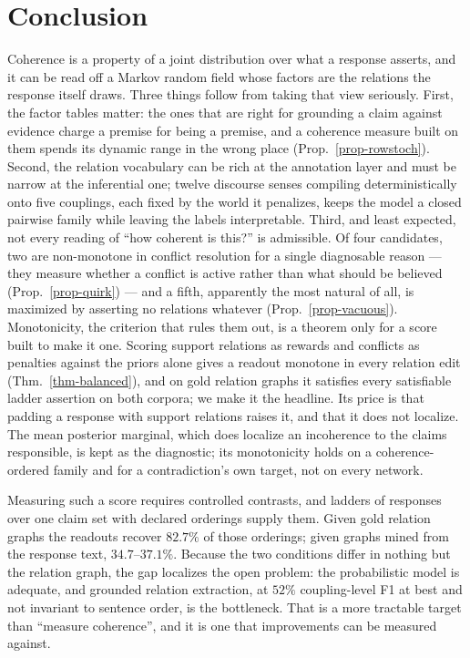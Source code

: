 \section{Conclusion}

Coherence is a property of a joint distribution over what a response asserts, and it can be read off a
Markov random field whose factors are the relations the response itself draws. Three things follow from
taking that view seriously. First, the factor tables matter: the ones that are right for grounding a
claim against evidence charge a premise for being a premise, and a coherence measure built on them
spends its dynamic range in the wrong place (Prop.~\ref{prop-rowstoch}). Second, the relation
vocabulary can be rich at the annotation layer and must be narrow at the inferential one; twelve
discourse senses compiling deterministically onto five couplings, each fixed by the world it penalizes,
keeps the model a closed pairwise family while leaving the labels interpretable. Third, and least
expected, not every reading of ``how coherent is this?'' is admissible. Of four candidates, two are
non-monotone in conflict resolution for a single diagnosable reason --- they measure whether a conflict
is active rather than what should be believed (Prop.~\ref{prop-quirk}) --- and a fifth, apparently the
most natural of all, is maximized by asserting no relations whatever (Prop.~\ref{prop-vacuous}).
Monotonicity, the criterion that rules them out, is a theorem only for a score built to make it one.
Scoring support relations as rewards and conflicts as penalties against the priors alone gives a
readout monotone in every relation edit (Thm.~\ref{thm-balanced}), and on gold relation graphs it
satisfies every satisfiable ladder assertion on both corpora; we make it the headline. Its price is
that padding a response with support relations raises it, and that it does not localize. The mean
posterior marginal, which does localize an incoherence to the claims responsible, is kept as the
diagnostic; its monotonicity holds on a coherence-ordered family and for a contradiction's own
target, not on every network.

Measuring such a score requires controlled contrasts, and ladders of responses over one claim set with
declared orderings supply them. Given gold relation graphs the readouts recover $82.7\%$ of those
orderings; given graphs mined from the response text, $34.7$--$37.1\%$. Because the two conditions
differ in nothing but the relation graph, the gap localizes the open problem: the probabilistic model is
adequate, and grounded relation extraction, at $52\%$ coupling-level F1 at best and not invariant to
sentence order, is the bottleneck. That is a
more tractable target than ``measure coherence'', and it is one that improvements can be measured
against.

